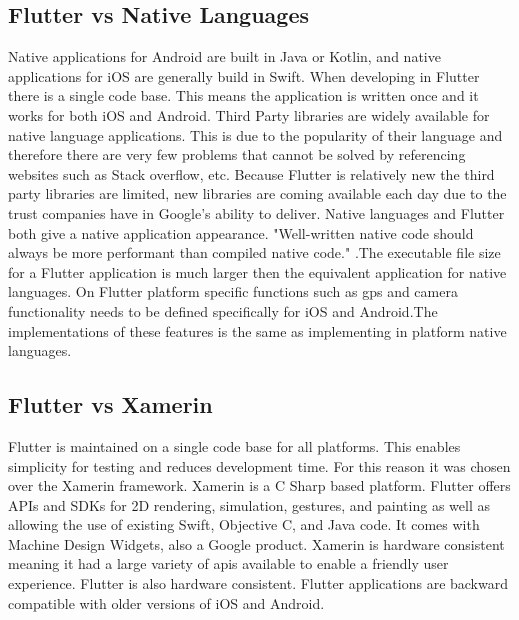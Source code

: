 \subsection{Flutter vs Native Languages}
Native applications for Android are built in Java or Kotlin, and native applications for iOS are generally build in Swift. When developing in Flutter there is a single code base. This means the application is written once and it works for both iOS and Android. Third Party libraries are widely available for native language applications. This is due to the popularity of their language and therefore there are very few problems that cannot be solved by referencing websites such as Stack overflow, etc. Because Flutter is relatively new the third party libraries are limited, new libraries are coming available each day due to the trust companies have in Google’s ability to deliver. Native languages and Flutter both give a native application appearance. "Well-written native code should always be more performant than compiled native code." \cite{FlutterVS_2018}.The executable file size for a Flutter application is much larger then the equivalent application for native languages. On Flutter platform specific functions such as gps and camera functionality needs to be defined specifically for iOS and Android.The implementations of these features is the same as implementing in platform native languages.\cite{flutter_application}

\subsection{Flutter vs Xamerin}
Flutter is maintained on a single code base for all platforms. This enables simplicity for testing and reduces development time. For this reason it was chosen over the Xamerin framework. Xamerin is a C Sharp based platform. Flutter offers APIs and SDKs for 2D rendering, simulation, gestures, and painting as well as allowing the use of existing Swift, Objective C, and Java code. It comes with Machine Design Widgets, also a Google product. \cite{flutterVsXamarin}Xamerin is hardware consistent meaning it had a large variety of apis available to enable a friendly user experience. Flutter is also hardware consistent. Flutter applications are backward compatible with older versions of iOS and Android.\cite{flutterVsReactVsXamarin}

